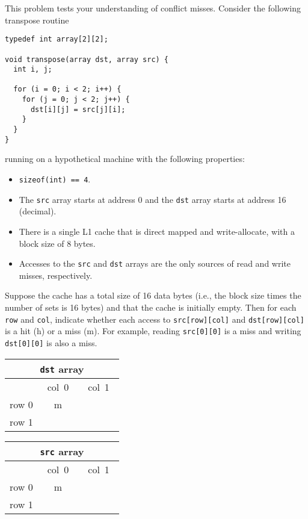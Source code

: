 \begin{problem}{8}
This problem tests your understanding of conflict misses.
Consider the following transpose routine
{\small\begin{verbatim}
typedef int array[2][2];

void transpose(array dst, array src) {
  int i, j;

  for (i = 0; i < 2; i++) {
    for (j = 0; j < 2; j++) {
      dst[i][j] = src[j][i];
    }
  }
}
\end{verbatim}}
running on a hypothetical machine with the following properties:
\begin{itemize}
\item {\tt sizeof(int) == 4}.
\item The {\tt src} array starts at address 0 and the {\tt dst} 
array starts at address 16 (decimal).
\item There is a single L1 cache that is direct mapped and write-allocate, 
with  a block size of 8 bytes.
\item Accesses to the {\tt src} and {\tt dst} arrays are the only
sources of read and write misses, respectively.
\end{itemize}

\begin{subproblem}
\item Suppose the cache has a total size of 16 data bytes (i.e.,
the block size times the number of sets is 16 bytes) and that the
cache is initially empty. Then for each {\tt row} and {\tt col},
indicate whether each access to {\tt src[row][col]} and {\tt dst[row][col]} is
a hit (h) or a miss (m).  For example, reading {\tt src[0][0]} is a
miss and writing {\tt dst[0][0]} is also a miss.

\begin{minipage}[t]{2in}
\renewcommand{\arraystretch}{1.8}
\begin{tabular}{|c||c|c|}
\hline
\multicolumn{3}{|c|}{{\tt dst} array}\\
\hline
&\mbox{\ col 0\ }&\mbox{\ col 1\ }\\
\hline
\hline
row 0&m&\\
\hline
row 1&&\\
\hline 
\end{tabular}
\end{minipage}
\begin{minipage}[t]{2in}
\renewcommand{\arraystretch}{1.8}
\begin{tabular}{|c||c|c|}
\hline
\multicolumn{3}{|c|}{{\tt src} array}\\
\hline
&\mbox{\ col 0\ }&\mbox{\ col 1\ }\\
\hline
\hline
row 0&m&\\
\hline
row 1&&\\
\hline
\end{tabular}
\end{minipage}
\end{subproblem}
\end{problem}
